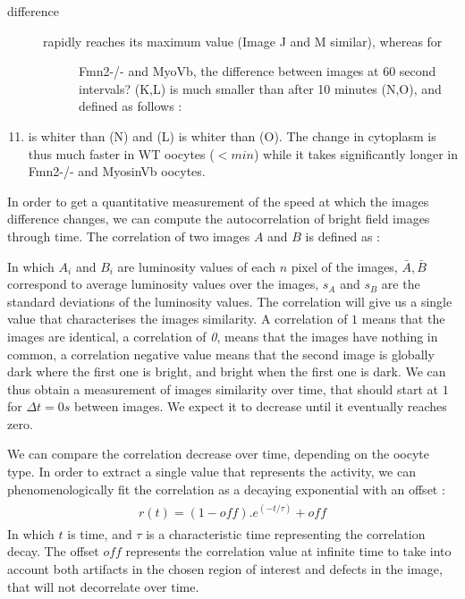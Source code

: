 \documentclass[A4paperpaper,11pt,english]{sphinxmanual}
\begin{document}
\begin{description}
\item[{difference}] \leavevmode\begin{description}
\item[{rapidly reaches its maximum value (Image J and M similar), whereas for}] \leavevmode
Fmn2-/- and MyoVb, the difference between images at 60 second intervals?
(K,L) is much smaller than after 10 minutes (N,O), and defined as follows :

\end{description}

\end{description}
\begin{enumerate}
\setcounter{enumi}{10}
\item {} 
is whiter than (N) and (L) is whiter than (O). The change in cytoplasm
is thus much faster in WT oocytes (\(< min\)) while it takes
significantly longer in Fmn2-/- and MyosinVb oocytes.

\end{enumerate}

In order to get a quantitative measurement of the speed at which the images difference changes, we can compute the autocorrelation of bright field images
through time. The correlation of two images \(A\) and \(B\) is defined as :

In which \(A_i\) and \(B_i\) are luminosity values of each
\(n\) pixel of the images,  \(\bar{A},\bar{B}\) correspond to average
luminosity values over the images, \(s_A\) and \(s_B\) are the standard
deviations of the luminosity values. The correlation will give us a single
value that characterises the images similarity. A correlation of
\(1\) means that the images are identical, a correlation of \emph{0}, means that the
images have nothing in common, a correlation negative value means that the
second image is globally dark where the first one is bright, and bright when the
first one is dark. We can thus obtain a measurement of images similarity
over time, that should start at \(1\) for \(\Delta t=0s\) between
images. We expect it to decrease until it eventually reaches zero.

We can compare the correlation decrease over time, depending on the oocyte type. In order to extract a single value that represents the activity, we can
phenomenologically fit the correlation as a decaying exponential with an offset
:
\label{index-latex:equation-edecay}\begin{gather}
\begin{split}r(t) = (1-off).e^{(-t/\tau)}+off\end{split}\label{index-latex-edecay}
\end{gather}
In which \(t\) is time, and \(\tau\) is a characteristic time
representing the correlation decay. The offset  \(off\) represents the  correlation value
at infinite time to take into account both artifacts in the chosen
region of interest and defects in the image, that will not decorrelate over
time.
\end{document}
